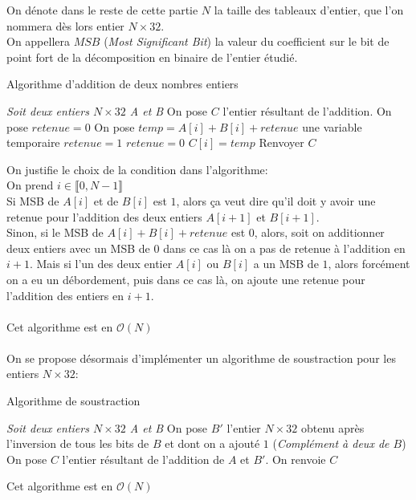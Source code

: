 \documentclass[12 pt]{article}
\begin{document}
On dénote dans le reste de cette partie $N$ la taille des tableaux d'entier, que l'on nommera dès lors entier $N \times 32$.
\\
On appellera $MSB$ (\textit{Most Significant Bit}) la valeur du coefficient sur le bit de point fort de la décomposition en binaire de l'entier étudié.

\begin{algorithm}
	\caption{Algorithme d'addition de deux nombres entiers}
	\label{addition}
	\begin{algorithmic}[1]
		\State \textit{Soit deux entiers $N \times 32$ A et B}
		\State On pose $C$ l'entier résultant de l'addition.
		\State On pose $retenue = 0$
		\State On pose $temp = A[i] + B[i] + retenue$ une variable temporaire
		\State $retenue = 1$
		\Else
		\State $retenue = 0$
		\EndIf
		\State $C[i] = temp$
		\EndFor
		\State Renvoyer $C$
	\end{algorithmic}
\end{algorithm}

On justifie le choix de la condition dans l'algorithme:\\
On prend $i \in \llbracket 0, N-1 \rrbracket$\\
Si MSB de $A[i]$ et de $B[i]$ est $1$, alors ça veut dire qu'il doit y avoir une retenue pour l'addition des deux entiers $A[i+1]$ et $B[i+1]$.\\
Sinon, si le MSB de $A[i] + B[i] + retenue$ est $0$, alors, soit on additionner deux entiers avec un MSB de $0$ dans ce cas là on a pas de retenue à l'addition en $i+1$. Mais si l'un des deux entier $A[i]$ ou $B[i]$ a un MSB de $1$, alors forcément on a eu un débordement, puis dans ce cas là, on ajoute une retenue pour l'addition des entiers en $i+1$.\\\\
Cet algorithme est en $\mathcal{O}(N)$\\\\
On se propose désormais d'implémenter un algorithme de soustraction pour les entiers $N\times 32$:

\begin{algorithm}
	\caption{Algorithme de soustraction}
	\label{soustraction}
	\begin{algorithmic}[1]
		\State \textit{Soit deux entiers $N \times 32$ A et B}
		\State On pose $B'$ l'entier $N\times 32$ obtenu après l'inversion de tous les bits de $B$ et dont on a ajouté $1$ (\textit{Complément à deux de $B$})
		\State On pose $C$ l'entier résultant de l'addition de $A$ et $B'$.
		\State On renvoie $C$
	\end{algorithmic}
\end{algorithm}

Cet algorithme est en $\mathcal{O}(N)$
\end{document}
